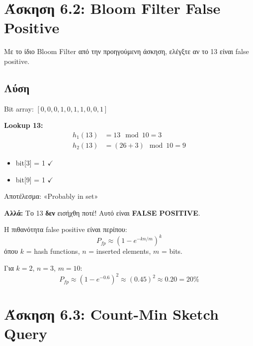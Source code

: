 \section{Άσκηση 6.2: Bloom Filter False Positive}

\begin{formulabox}[Εκφώνηση]
Με το ίδιο Bloom Filter από την προηγούμενη άσκηση, ελέγξτε αν το 13 είναι
false positive.
\end{formulabox}

\subsection*{Λύση}

Bit array: $[0, 0, 0, 1, 0, 1, 1, 0, 0, 1]$

\textbf{Lookup 13:}
\begin{align*}
h_1(13) &= 13 \mod 10 = 3 \\
h_2(13) &= (26 + 3) \mod 10 = 9
\end{align*}

\begin{itemize}
    \item bit[3] = 1 $\checkmark$
    \item bit[9] = 1 $\checkmark$
\end{itemize}

Αποτέλεσμα: «Probably in set»

\textbf{Αλλά:} Το 13 \textbf{δεν} εισήχθη ποτέ! Αυτό είναι \textbf{FALSE POSITIVE}.

\begin{warningbox}
Η πιθανότητα false positive είναι περίπου:
$$P_{fp} \approx \left(1 - e^{-kn/m}\right)^k$$
όπου $k$ = hash functions, $n$ = inserted elements, $m$ = bits.

Για $k=2$, $n=3$, $m=10$:
$$P_{fp} \approx (1 - e^{-0.6})^2 \approx (0.45)^2 \approx 0.20 = 20\%$$
\end{warningbox}

\section{Άσκηση 6.3: Count-Min Sketch Query}

